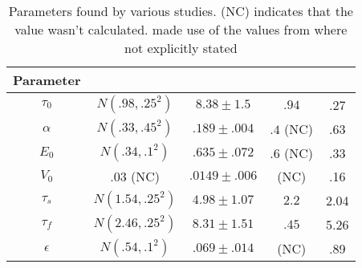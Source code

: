 \begin{table}[t]
\centering
\begin{tabular}{|c || c | c | c | c|}
\hline 
Parameter  & \cite{Friston2000} & \cite{Johnston2008} & \cite{Vakorin2007} & \cite{Deneux2006}\\
\hline
$\tau_0  $ &  $N(.98 , .25^2)$  & $8.38 \pm 1.5  $ & $.94$ & .27\\
$\alpha  $ &  $N(.33 , .45^2)$  & $.189 \pm .004 $ & $.4$ (NC) & .63 \\
$E_0     $ &  $N(.34 , .1 ^2)$  & $.635 \pm .072 $ & $.6$ (NC) & .33\\
$V_0     $ &  $.03$ (NC)        & $.0149 \pm .006$ & (NC) & .16\\
$\tau_s  $ &  $N(1.54, .25^2)$  & $4.98 \pm 1.07 $ & $2.2$ & 2.04 \\
$\tau_f  $ &  $N(2.46, .25^2)$  & $8.31 \pm 1.51 $ & $.45$ & 5.26\\
$\epsilon$ &  $N(.54 , .1 ^2)$  & $.069 \pm .014 $ & (NC) & .89\\
\hline
\end{tabular}
\caption{Parameters found by various studies. (NC) indicates that the value
wasn't calculated. \cite{Vakorin2007} made use of the values from \cite{Friston2002}
where not explicitly stated}
\label{tab:Params} 
\end{table}

